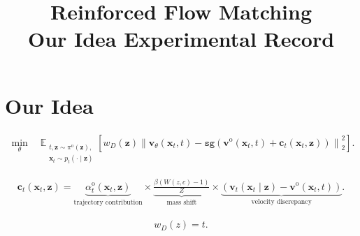 \documentclass[10pt]{article}
\title{Reinforced Flow Matching\\Our Idea Experimental Record}
\author{}
\date{}
\begin{document}
\maketitle

\section{Our Idea}

\begin{align}
\min_{\theta}
\quad
\mathbb{E}_{
\substack{
t,\mathbf z\sim\pi^{\mathrm{o}}(\mathbf z),\\
\mathbf x_t\sim p_t(\cdot\mid\mathbf z)
}
}
\left[
w_D(\mathbf z)
\left\|
\mathbf v_{\theta}(\mathbf x_t,t)
-
\mathtt{sg}\!\left(
\mathbf v^{\mathrm{o}}(\mathbf x_t,t)
+
\mathbf c_t(\mathbf x_t,\mathbf z)
\right)
\right\|_2^2
\right].
\end{align}

\begin{align}
\mathbf c_t(\mathbf x_t,\mathbf z)
=
\underbrace{
\alpha_t^{\mathrm{o}}(\mathbf x_t,\mathbf z)
}_{\text{trajectory contribution}}
\times
\underbrace{
\frac{
\beta\left(W(z,c)-1\right)
}{Z}
}_{\text{mass shift}}
\times
\underbrace{
\left(
\mathbf v_t(\mathbf x_t\mid\mathbf z)
-
\mathbf v^{\mathrm{o}}(\mathbf x_t,t)
\right)
}_{\text{velocity discrepancy}}.
\end{align}

\begin{align}
w_D(z)=t.
\end{align}
\end{document}
